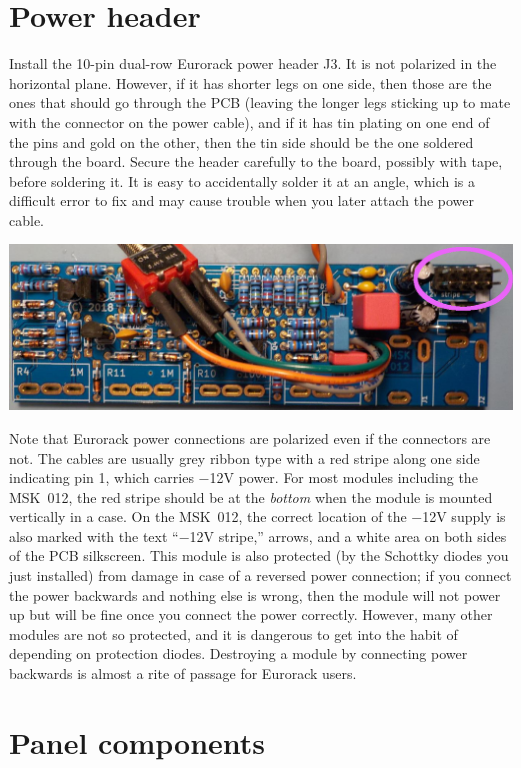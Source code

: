 \section{Power header}

Install the 10-pin dual-row Eurorack power header J3.
It is not polarized
in the horizontal plane.  However, if it has shorter legs on one side, then
those are the ones that should go through the PCB (leaving the longer legs
sticking up to mate with the connector on the power cable), and if it has
tin plating on one end of the pins and gold on the other, then the tin side
should be the one soldered through the board.  Secure the header carefully
to the board, possibly with tape, before soldering it.  It is easy to
accidentally solder it at an angle, which is a difficult error to fix and
may cause trouble when you later attach the power cable.

\noindent\includegraphics[width=\linewidth]{power.jpg}

Note that Eurorack power connections are polarized even if the connectors
are not.  The cables are usually grey ribbon type with a red stripe along
one side indicating pin 1, which carries $-$12V power.  For most modules
including the MSK~012, the red stripe should be at the \emph{bottom} when
the module is mounted vertically in a case.  On the MSK~012, the correct
location of the $-$12V supply is also marked with the text ``$-$12V
stripe,'' arrows, and a white area on both sides of the PCB silkscreen. 
This module is also protected (by the Schottky diodes you just installed)
from damage in case of a reversed power connection; if you connect the power
backwards and nothing else is wrong, then the module will not power up but
will be fine once you connect the power correctly.  However, many other
modules are not so protected, and it is dangerous to get into the habit of
depending on protection diodes.  Destroying a module by connecting power
backwards is almost a rite of passage for Eurorack users.

\section{Panel components}

